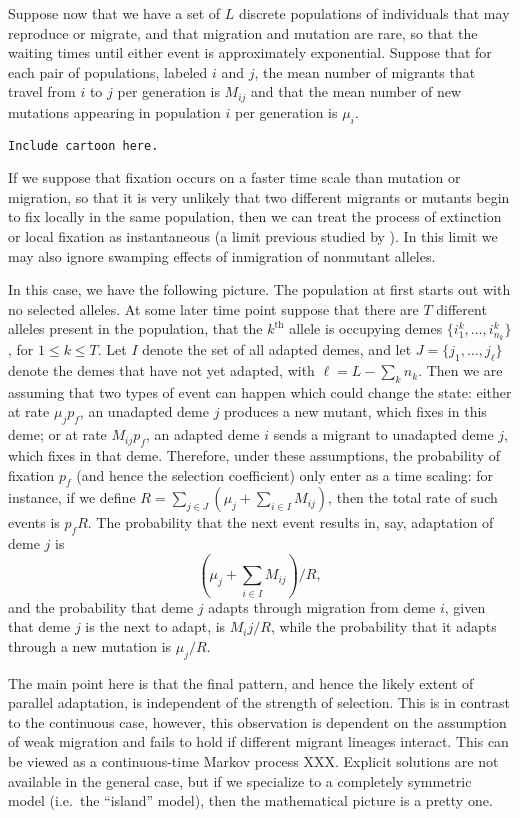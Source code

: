 \documentclass{article}
\begin{document}
Suppose now that we have a set of $L$ discrete populations of individuals that may reproduce or migrate,
and that migration and mutation are rare, so that the waiting times until either event is approximately exponential.
Suppose that for each pair of populations, labeled $i$ and $j$, the mean number of migrants that travel from $i$ to $j$ per generation
is $M_{ij}$ and that the mean number of new mutations appearing in population $i$ per generation is $\mu_i$.

{\tt Include cartoon here.}

If we suppose that fixation occurs on a faster time scale than mutation or migration,
so that it is very unlikely that two different migrants or mutants begin to fix locally in the same population,
then we can treat the process of extinction or local fixation as instantaneous 
(a limit previous studied by \cite{Slatkin:81}).
In this limit we may also ignore swamping effects of inmigration of nonmutant alleles.

In this case, we have the following picture.
The population at first starts out with no selected alleles. 
At some later time point suppose that there are $T$ different alleles present in the population, 
that the $k^\mathrm{th}$ allele is occupying demes $\{i^k_1, \ldots, i^k_{n_k}\}$, for $1\le k \le T$.
Let $I$ denote the set of all adapted demes, 
and let $J = \{j_1, \ldots, j_\ell\}$ denote the demes that have not yet adapted, with $\ell = L - \sum_k n_k$.
Then we are assuming that two types of event can happen which could change the state:
either at rate $\mu_j p_f$, an unadapted deme $j$ produces a new mutant, which fixes in this deme;
or at rate $M_{ij} p_f$, an adapted deme $i$ sends a migrant to unadapted deme $j$, which fixes in that deme.
Therefore, under these assumptions, the probability of fixation $p_f$ (and hence the selection coefficient)
only enter as a time scaling: for instance,
if we define $R = \sum_{j \in J} \left( \mu_j + \sum_{i \in I} M_{ij} \right)$,
then the total rate of such events is $p_f R$.
The probability that the next event results in, say, adaptation of deme $j$
is 
\[
 \left( \mu_j + \sum_{i \in I} M_{ij} \right) / R,
\]
and the probability that deme $j$ adapts through migration from deme $i$, given that deme $j$ is the next to adapt, is
$M_ij / R$,
while the probability that it adapts through a new mutation is $\mu_j / R$.

The main point here is that the final pattern,
and hence the likely extent of parallel adaptation,
is independent of the strength of selection.
This is in contrast to the continuous case, however, this observation is dependent on the assumption of weak migration
and fails to hold if different migrant lineages interact.
This can be viewed as a continuous-time Markov process XXX.
Explicit solutions are not available in the general case,
but if we specialize to a completely symmetric model (i.e.\ the ``island'' model),
then the mathematical picture is a pretty one.
\end{document}
